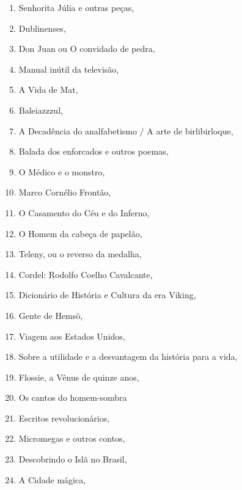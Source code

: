 \begin{multicols}{2}
\begin{enumerate}
\item Senhorita Júlia e outras peças, {}
\item Dublinenses, {}
\item Don Juan ou O convidado de pedra, {}
\item Manual inútil da televisão, {}
\item A Vida de Mat, {}
\item Baleiazzzul, {}
\item A Decadência do analfabetismo / A arte de birlibirloque, {}
\item Balada dos enforcados e outros poemas, {}
\item O Médico e o monstro, {}
\item Marco Cornélio Frontão, {}
\item O Casamento do Céu e do Inferno, {}
\item O Homem da cabeça de papelão, {}
\item Teleny, ou o reverso da medalha, {}
\item Cordel: Rodolfo Coelho Cavalcante, {}
\item Dicionário de História e Cultura da era Viking, {}
\item Gente de Hemsö, {}
\item Viagem aos Estados Unidos, {}
\item Sobre a utilidade e a desvantagem da história para a vida, {}
\item Flossie, a Vênus de quinze anos, {}
\item Os cantos do homem-sombra
\item Escritos revolucionários, {}
\item Micromegas e outros contos, {}
\item Descobrindo o Islã no Brasil, {}
\item A Cidade mágica, {}

\end{enumerate}
\end{multicols}
